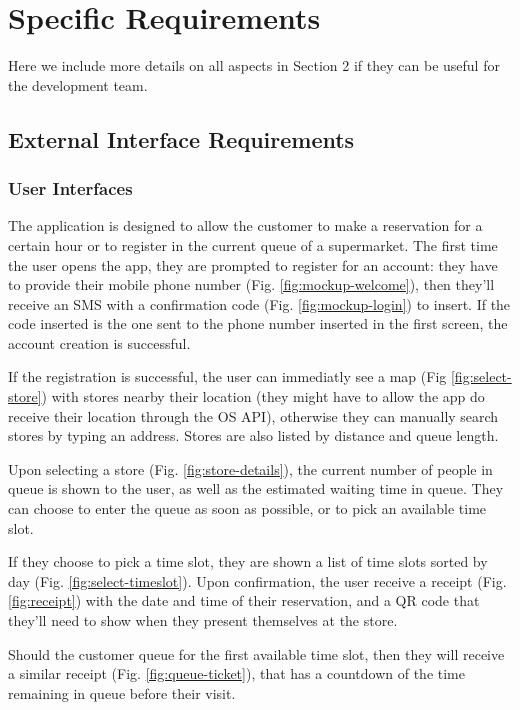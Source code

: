 
\section{Specific Requirements}\label{sec:spec_req}

Here we include more details on all aspects in Section 2 if they
can be useful for the development team. 

\subsection{External Interface Requirements}
\subsubsection{User Interfaces}

The application is designed to allow the customer to make a reservation for a certain hour
or to register in the current queue of a supermarket. The first time the user opens the app,
they are prompted to register for an account: they have to provide their mobile phone number
(Fig. \ref{fig:mockup-welcome}), then they'll receive an SMS with a confirmation code
(Fig. \ref{fig:mockup-login}) to insert.
If the code inserted is the one sent to the phone number inserted in the first screen, the
account creation is successful.

If the registration is successful, the user can immediatly see a map (Fig \ref{fig:select-store})
with stores nearby their location (they might have to allow the app do receive their location through
the OS API), otherwise they can manually search stores by typing an address.
Stores are also listed by distance and queue length.

Upon selecting a store (Fig. \ref{fig:store-details}), the current number of people in queue is shown to the user,
as well as the estimated waiting time in queue. They can choose to enter the queue as soon as
possible, or to pick an available time slot.

If they choose to pick a time slot, they are shown a list of time slots sorted by day (Fig. \ref{fig:select-timeslot}).
Upon confirmation, the user receive a receipt (Fig. \ref{fig:receipt}) with the date and time of their reservation,
and a QR code that they'll need to show when they present themselves at the store.

Should the customer queue for the first available time slot, then they will receive a similar receipt (Fig. \ref{fig:queue-ticket}),
that has a countdown of the time remaining in queue before their visit.


